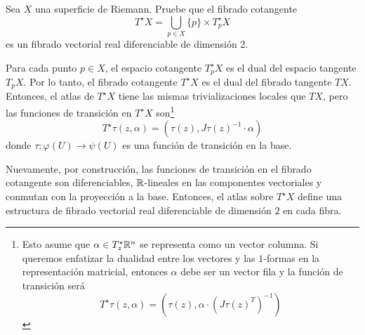 \begin{exercise}
Sea $X$ una superficie de Riemann. Pruebe que el fibrado cotangente
$$T^\star X = \bigcup_{p \in X} \{ p \} \times T_p^\star X$$
es un fibrado vectorial real diferenciable de dimensión 2.
\end{exercise}

\begin{solution}
Para cada punto $p \in X$, el espacio cotangente $T_p^\star X$ es el dual del espacio tangente $T_pX$. Por lo tanto, el fibrado cotangente $T^\star X$ es el dual del fibrado tangente $TX$. Entonces, el atlas de $T^\star X$ tiene las mismas trivializaciones locales que $TX$, pero las funciones de transición en $T^\star X$ son\footnote{Esto asume que $\alpha \in T_z^\star \mathbb R^n$ se representa como un vector columna. Si queremos enfatizar la dualidad entre los vectores y las $1$-formas en la representación matricial, entonces $\alpha$ debe ser un vector fila y la función de transición será
$$T^\star \tau(z, \alpha) = (\tau(z), \alpha \cdot (J\tau(z)^T)^{-1})$$}
$$T^\star \tau(z, \alpha) = (\tau(z), J\tau(z)^{-1} \cdot \alpha)$$
donde $\tau : \varphi(U) \to \psi(U)$ es una función de transición en la base.

Nuevamente, por construcción, las funciones de transición en el fibrado cotangente son diferenciables, $\mathbb R$-lineales en las componentes vectoriales y conmutan con la proyección a la base. Entonces, el atlas sobre $T^\star X$ define una estructura de fibrado vectorial real diferenciable de dimensión $2$ en cada fibra.
\end{solution}
